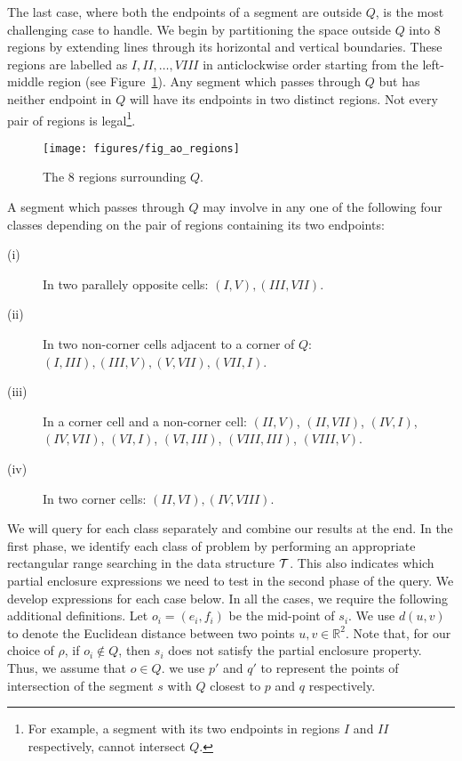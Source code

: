 The last case, where both the endpoints of a segment are outside $Q$, 
is the most challenging case to handle. We begin by partitioning the 
space outside $Q$ into 8 regions by extending lines through its 
horizontal and vertical boundaries. These regions are labelled as 
$I, II, \ldots, VIII$ in anticlockwise order starting from the 
left-middle region (see Figure~\ref{fig:rectangles:ao:regions}). Any 
segment which passes through $Q$ but has neither endpoint in $Q$ 
will have its endpoints in two distinct regions. Not every pair of 
regions is legal\footnote{For example, a segment with its two endpoints 
in regions $I$ and $II$ respectively, cannot intersect $Q$.}.

\begin{figure}[t]
\begin{center}
  \texttt{[image: figures/fig\_ao\_regions]}
  \caption{The 8 regions surrounding $Q$.}
  \label{fig:rectangles:ao:regions}
\end{center}
\end{figure}

A segment which passes through $Q$ may involve in any one of the following 
four classes depending on the pair of regions containing its two endpoints:

\begin{description}
\item[(i)] In two parallely opposite cells: $(I, V), (III, VII)$.
\item[(ii)] In two non-corner cells adjacent to a corner of $Q$: $(I, III), 
(III, V), (V,VII), (VII, I)$.
\item[(iii)] In a corner cell and a non-corner cell: $(II, V)$, $(II, VII)$, 
$(IV, I)$, 
$(IV, VII)$, $(VI, I)$, \newline $(VI, III)$, $(VIII, III)$, $(VIII, V)$.
\item[(iv)] In two corner cells: $(II, VI), (IV, VIII)$.
\end{description}

We will query for each class separately and combine our results at the end. 
In the first phase, we identify each class of problem 
by performing an appropriate rectangular range searching in the 
data structure $\cal T$. 
This also indicates which partial enclosure expressions we need to test in 
the second phase of the query. We develop expressions for each case below. 
In all the cases, we require the following additional definitions. Let 
$o_i = (e_i, f_i)$ be the mid-point of $s_i$. We use  
$d(u,v)$ to denote the Euclidean distance between two points $u,v \in 
\mathbb{R}^2$. Note that, for our choice of $\rho$, if $o_i \not\in Q$, 
then $s_i$ does not satisfy the partial enclosure property. Thus, we assume 
that 
$o \in Q$. we use $p'$ and $q'$ to represent the points of intersection of the 
segment 
$s$ with $Q$ closest to $p$ and $q$ respectively.

